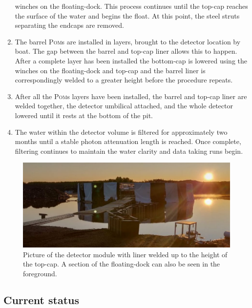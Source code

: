 \begin{enumerate}
          winches on the floating-dock. This process continues until the top-cap reaches the
          surface of the water and begins the float. At this point, the steel struts separating
          the endcaps are removed.
    \item The barrel \textsc{Pom}s are installed in layers, brought to the detector location by
          boat. The gap between the barrel and top-cap liner allows this to happen. After a
          complete layer has been installed the bottom-cap is lowered using the winches on the
          floating-dock and top-cap and the barrel liner is correspondingly welded to a greater
          height before the procedure repeats.
    \item After all the \textsc{Pom}s layers have been installed, the barrel and top-cap liner are
          welded together, the detector umbilical attached, and the whole detector lowered until
          it rests at the bottom of the pit.
    \item The water within the detector volume is filtered for approximately two months until a
          stable photon attenuation length is reached. Once complete, filtering continues to
          maintain the water clarity and data taking runs begin.
\end{enumerate}

\begin{figure} %
    \includegraphics[width=\textwidth]{diagrams/4-chips/chips_with_liner_sun.pdf}
    \caption[Picture of the \chipsfive detector module with liner]
    {Picture of the \chipsfive detector module with liner welded up to the height of the top-cap.
        A section of the floating-dock can also be seen in the foreground.}
    \label{fig:chips_with_liner}
\end{figure}

\subsection{Current status} %
\label{sec:chips_detector_status} %

